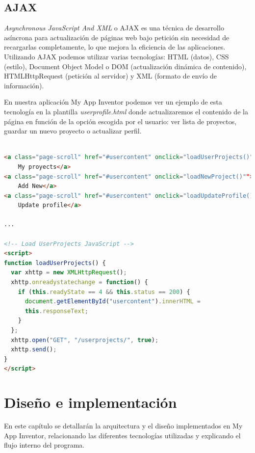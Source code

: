 \documentclass[a4paper, 12pt]{book}
\begin{document}
\section{AJAX} 
\label{sec:seccion10}
\textit{Asynchronous JavaScript And XML} o AJAX es una técnica de desarrollo asíncrona para actualización de páginas web bajo petición sin necesidad de recargarlas completamente, lo que mejora la eficiencia de las aplicaciones. Utilizando AJAX podemos utilizar varias tecnologías: HTML (datos), CSS (estilo), Document Object Model o DOM (actualización dinámica de contenido), HTMLHttpRequest (petición al servidor) y XML (formato de envío de información).

En nuestra aplicación My App Inventor podemos ver un ejemplo de esta tecnología en la plantilla \textit{userprofile.html} donde actualizaremos el contenido de la página en función de la opción escogida por el usuario: ver lista de proyectos, guardar un nuevo proyecto o actualizar perfil.
\vspace{5mm}
\begin{lstlisting}[language=HTML]

<a class="page-scroll" href="#usercontent" onclick="loadUserProjects()">
	My proyects</a>
<a class="page-scroll" href="#usercontent" onclick="loadNewProject()"">
	Add New</a>
<a class="page-scroll" href="#usercontent" onclick="loadUpdateProfile()">
	Update profile</a>

...

<!-- Load UserProjects JavaScript -->
<script>
function loadUserProjects() {
  var xhttp = new XMLHttpRequest();
  xhttp.onreadystatechange = function() {
    if (this.readyState == 4 && this.status == 200) {
      document.getElementById("usercontent").innerHTML =
      this.responseText;
    }
  };
  xhttp.open("GET", "/userprojects/", true);
  xhttp.send();
}
</script>
\end{lstlisting}


\cleardoublepage
\chapter{Diseño e implementación}
En este capítulo se detallarán la arquitectura y el diseño implementados en My App Inventor, relacionando las diferentes tecnologías utilizadas y explicando el flujo interno del programa.  
\end{document}
